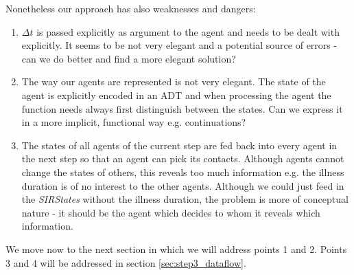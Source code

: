 Nonetheless our approach has also weaknesses and dangers:
\begin{enumerate}
	\item $\Delta t$ is passed explicitly as argument to the agent and needs to be dealt with explicitly. It seems to be not very elegant and a potential source of errors - can we do better and find a more elegant solution? 
	\item The way our agents are represented is not very elegant. The state of the agent is explicitly encoded in an ADT and when processing the agent the function needs always first distinguish between the states. Can we express it in a more implicit, functional way e.g. continuations?
	\item The states of all agents of the current step are fed back into every agent in the next step so that an agent can pick its contacts. Although agents cannot change the states of others, this reveals too much information e.g. the illness duration is of no interest to the other agents. Although we could just feed in the \textit{SIRStates} without the illness duration, the problem is more of conceptual nature - it should be the agent which decides to whom it reveals which information.
\end{enumerate}

We move now to the next section in which we will address points 1 and 2. Points 3 and 4 will be addressed in section \ref{sec:step3_dataflow}.
